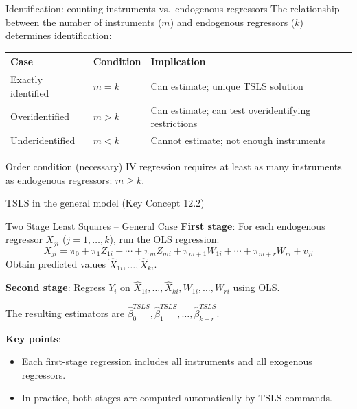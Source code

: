 \documentclass[10pt]{beamer}
\begin{document}
\begin{frame}{Identification: counting instruments vs.\ endogenous regressors}
\label{slide:identification}
The relationship between the number of instruments ($m$) and endogenous regressors ($k$) determines identification:

\begin{center}
\renewcommand{\arraystretch}{1.3}
\begin{tabular}{@{}lll@{}}
\toprule
\textbf{Case} & \textbf{Condition} & \textbf{Implication} \\
\midrule
Exactly identified & $m = k$ & Can estimate; unique TSLS solution \\
Overidentified & $m > k$ & Can estimate; can test overidentifying restrictions \\
\alert{Underidentified} & $m < k$ & \alert{Cannot estimate}; not enough instruments \\
\bottomrule
\end{tabular}
\end{center}

\pause
\begin{exampleblock}{Order condition (necessary)}
IV regression requires \alert{at least as many instruments as endogenous regressors}: $m \geq k$.
\end{exampleblock}
\end{frame}

\begin{frame}{TSLS in the general model (Key Concept 12.2)}
\label{slide:tsls_general}
\begin{block}{Two Stage Least Squares -- General Case}
\textbf{First stage}: For each endogenous regressor $X_{ji}$ ($j=1,\ldots,k$), run the OLS regression:
\[
X_{ji} = \pi_0 + \pi_1 Z_{1i} + \cdots + \pi_m Z_{mi} + \pi_{m+1}W_{1i} + \cdots + \pi_{m+r}W_{ri} + v_{ji}
\]
Obtain predicted values $\widehat{X}_{1i}, \ldots, \widehat{X}_{ki}$.

\vspace{0.5em}
\textbf{Second stage}: Regress $Y_i$ on $\widehat{X}_{1i}, \ldots, \widehat{X}_{ki}, W_{1i}, \ldots, W_{ri}$ using OLS.

\vspace{0.5em}
The resulting estimators are $\widehat{\beta}_0^{TSLS}, \widehat{\beta}_1^{TSLS}, \ldots, \widehat{\beta}_{k+r}^{TSLS}$.
\end{block}

\pause
\vspace{0.3em}
\textbf{Key points}:
\begin{itemize}
  \item Each first-stage regression includes \alert{all} instruments and \alert{all} exogenous regressors.
  \item In practice, both stages are computed automatically by TSLS commands.
\end{itemize}
\end{frame}
\end{document}
